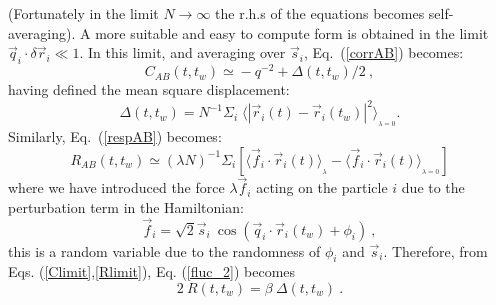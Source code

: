 (Fortunately in the limit $N \to \infty$ the r.h.s of the 
equations becomes self-averaging).
A more suitable and easy to compute form is obtained 
in the limit ${\vec q}_i \cdot \delta {\vec r}_i \ll 1$.
In this limit, and averaging over ${\vec s}_i$,
Eq.~(\ref{corrAB}) becomes: 
\begin{equation}
C_{AB}(t,t_w)\!\simeq\! - q^{-2} + \Delta(t,t_w)/2 \ ,
\label{Climit} 
\end{equation}
having defined the mean square displacement:
\begin{equation}
\Delta (t,t_w) = N^{-1} \Sigma_i \;
\langle | {\vec r }_i(t) - {\vec r}_i(t_w) |^2 \rangle_{_{\lambda=0}}.
\end{equation}
Similarly, Eq.~(\ref{respAB}) becomes:
\begin{equation}
R_{AB}(t,t_w)\!\simeq\! (\lambda N)^{-1} \Sigma_i [ 
\langle {\vec f}_i \cdot {\vec r}_i(t) \rangle_{_{\lambda}}\!-\! 
\langle {\vec f}_i \cdot {\vec r}_i(t) \rangle_{_{\lambda=0}} ]
\label{Rlimit}
\end{equation}
where we have introduced  the force 
$\lambda{\vec f}_i$ acting on the particle $i$ due to the perturbation term 
in the Hamiltonian:
\begin{equation}
{\vec f}_i =\sqrt2  {\vec s}_i \ \cos ({\vec q}_i \cdot {\vec r}_i(t_w)+\phi_i) \ ,
\label{forze}
\end{equation}
this is a random variable due to the randomness of $\phi_i$ and ${\vec s}_i$.
Therefore, from Eqs. (\ref{Climit},\ref{Rlimit}), 
Eq. (\ref{fluc_2}) becomes   
\begin{equation}
2\ R(t,t_w) = \beta\  \Delta(t,t_w) \ .
\label{fdt_2}
\end{equation}

